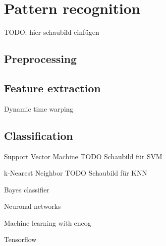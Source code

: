 \section{Pattern recognition}
TODO: hier schaubild einfügen
\subsection{Preprocessing}
\subsection{Feature extraction}
Dynamic time warping
\subsection{Classification}
Support Vector Machine
TODO Schaubild für SVM

k-Nearest Neighbor
TODO Schaubild für KNN

Bayes classifier

Neuronal networks

Machine learning with encog

Tensorflow